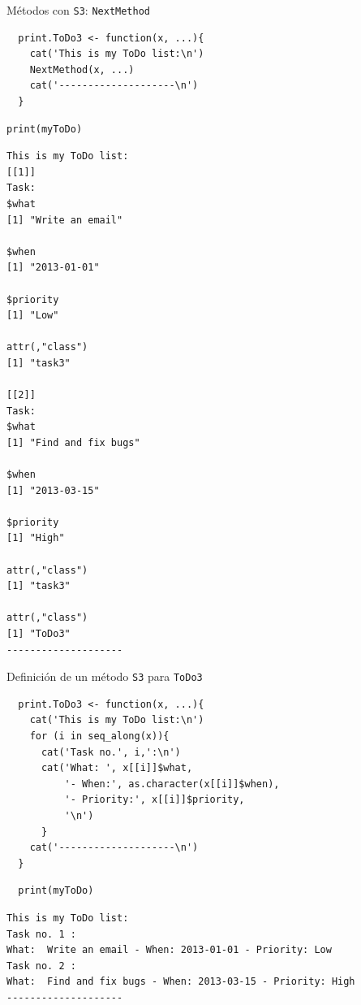 \documentclass[xcolor={usenames,svgnames,dvipsnames}]{beamer}
\begin{document}
\begin{frame}[fragile,label={sec:orgheadline11}]{Métodos con \texttt{S3}: \texttt{NextMethod}}
 \lstset{language=R,label= ,caption= ,captionpos=b,numbers=none}
\begin{lstlisting}
  print.ToDo3 <- function(x, ...){
    cat('This is my ToDo list:\n')
    NextMethod(x, ...)
    cat('--------------------\n')
  }
\end{lstlisting}

\lstset{language=R,label= ,caption= ,captionpos=b,numbers=none}
\begin{lstlisting}
print(myToDo)
\end{lstlisting}

\begin{verbatim}
This is my ToDo list:
[[1]]
Task:
$what
[1] "Write an email"

$when
[1] "2013-01-01"

$priority
[1] "Low"

attr(,"class")
[1] "task3"

[[2]]
Task:
$what
[1] "Find and fix bugs"

$when
[1] "2013-03-15"

$priority
[1] "High"

attr(,"class")
[1] "task3"

attr(,"class")
[1] "ToDo3"
--------------------
\end{verbatim}
\end{frame}


\begin{frame}[fragile,label={sec:orgheadline12}]{Definición de un método \texttt{S3} para \texttt{ToDo3}}
 \lstset{language=R,label= ,caption= ,captionpos=b,numbers=none}
\begin{lstlisting}
  print.ToDo3 <- function(x, ...){
    cat('This is my ToDo list:\n')
    for (i in seq_along(x)){
      cat('Task no.', i,':\n')
      cat('What: ', x[[i]]$what,
          '- When:', as.character(x[[i]]$when),
          '- Priority:', x[[i]]$priority,
          '\n')
      }
    cat('--------------------\n')
  }
\end{lstlisting}

\lstset{language=R,label= ,caption= ,captionpos=b,numbers=none}
\begin{lstlisting}
  print(myToDo)
\end{lstlisting}

\begin{verbatim}
This is my ToDo list:
Task no. 1 :
What:  Write an email - When: 2013-01-01 - Priority: Low 
Task no. 2 :
What:  Find and fix bugs - When: 2013-03-15 - Priority: High 
--------------------
\end{verbatim}
\end{frame}
\end{document}
